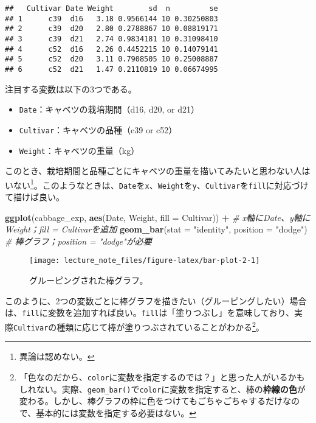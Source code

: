 \documentclass[]{book}
\newenvironment{Shaded}{\begin{snugshade}}{\end{snugshade}}
\newcommand{\KeywordTok}[1]{\textcolor[rgb]{0.13,0.29,0.53}{\textbf{#1}}}
\newcommand{\DataTypeTok}[1]{\textcolor[rgb]{0.13,0.29,0.53}{#1}}
\newcommand{\StringTok}[1]{\textcolor[rgb]{0.31,0.60,0.02}{#1}}
\newcommand{\CommentTok}[1]{\textcolor[rgb]{0.56,0.35,0.01}{\textit{#1}}}
\newcommand{\OperatorTok}[1]{\textcolor[rgb]{0.81,0.36,0.00}{\textbf{#1}}}
\newcommand{\NormalTok}[1]{#1}
\let\rmarkdownfootnote\footnote%
\def\footnote{\protect\rmarkdownfootnote}
\begin{document}
\begin{verbatim}
##   Cultivar Date Weight        sd  n         se
## 1      c39  d16   3.18 0.9566144 10 0.30250803
## 2      c39  d20   2.80 0.2788867 10 0.08819171
## 3      c39  d21   2.74 0.9834181 10 0.31098410
## 4      c52  d16   2.26 0.4452215 10 0.14079141
## 5      c52  d20   3.11 0.7908505 10 0.25008887
## 6      c52  d21   1.47 0.2110819 10 0.06674995
\end{verbatim}

注目する変数は以下の3つである。

\begin{itemize}
\item
  \texttt{Date}：キャベツの栽培期間（d16, d20, or d21）
\item
  \texttt{Cultivar}：キャベツの品種（c39 or c52）
\item
  \texttt{Weight}：キャベツの重量（kg）
\end{itemize}

このとき、栽培期間と品種ごとにキャベツの重量を描いてみたいと思わない人はいない\footnote{異論は認めない。}。このようなときは、\texttt{Date}を\texttt{x}、\texttt{Weight}を\texttt{y}、\texttt{Cultivar}を\texttt{fill}に対応づけて描けば良い。



\begin{Shaded}
\begin{Highlighting}[]
\KeywordTok{ggplot}\NormalTok{(cabbage_exp, }\KeywordTok{aes}\NormalTok{(Date, Weight, }\DataTypeTok{fill =}\NormalTok{ Cultivar)) }\OperatorTok{+}\StringTok{ }\CommentTok{# x軸にDate、y軸にWeight；fill = Cultivarを追加}
\StringTok{  }\KeywordTok{geom_bar}\NormalTok{(}\DataTypeTok{stat =} \StringTok{"identity"}\NormalTok{, }\DataTypeTok{position =} \StringTok{"dodge"}\NormalTok{) }\CommentTok{# 棒グラフ；position = "dodge"が必要}
\end{Highlighting}
\end{Shaded}

\begin{figure}

{\centering \texttt{[image: lecture\_note\_files/figure-latex/bar-plot-2-1]} 

}

\caption{グルーピングされた棒グラフ。}\label{fig:bar-plot-2}
\end{figure}

このように、2つの変数ごとに棒グラフを描きたい（グルーピングしたい）場合は、\texttt{fill}に変数を追加すれば良い。\texttt{fill}は「塗りつぶし」を意味しており、実際\texttt{Cultivar}の種類に応じて棒が塗りつぶされていることがわかる\footnote{「色なのだから、\texttt{color}に変数を指定するのでは？」と思った人がいるかもしれない。実際、\texttt{geom\_bar()}で\texttt{color}に変数を指定すると、棒の\textbf{枠線の色}が変わる。しかし、棒グラフの枠に色をつけてもごちゃごちゃするだけなので、基本的には変数を指定する必要はない。}。
\end{document}
